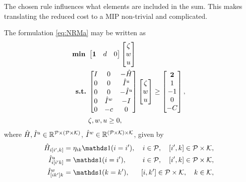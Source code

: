 The chosen rule influences what elements are included in the sum.
This makes translating the reduced cost to a MIP non-trivial and complicated.



The formulation \eqref{eq:NRMa} may be written as
\begin{equation}\label{eq:NRMa_primal_vector}
    \begin{split}
        \text{\textbf{min }} & \begin{bmatrix}
                   \bm{1} & d & 0
        \end{bmatrix} \begin{bmatrix}
                          \zeta \\ w \\ u
        \end{bmatrix} \\
        \text{\textbf{s.t.}}\; &
        \begin{bmatrix}
            I & 0 & -\hat{H} \\
            0 & 0 & \hat{I}^u \\
            0 & 0 & -\hat{I}^u \\
            0 & \hat{I}^w & -I \\
            0 & -c & 0
        \end{bmatrix}
        \begin{bmatrix}
            \zeta \\ w \\ u
        \end{bmatrix}
        \geq \begin{bmatrix}
                 \bm{2} \\ 1 \\ -1 \\ 0 \\ -C
        \end{bmatrix}, \\
        & \zeta, w, u \geq 0,
    \end{split}
\end{equation}
where $\hat{H}, \hat{I}^u \in \mathbb{R}^{\mathcal{P} \times (\mathcal{P} \times \mathcal{K})}$, $\hat{I}^w \in \mathbb{R}^{(\mathcal{P} \times \mathcal{K}) \times \mathcal{K}}$, given by
\begin{align*}
    \hat{H}_{i[i',k]} &= \eta_{ik} \Ind(i = i'), & i \in \P, \quad [i', k] \in \P \times \K, \\
    \hat{I}^u_{i[i'k]} &= \Ind(i = i'), & i \in \P, \quad [i', k] \in \P \times \K, \\
    \hat{I}^w_{[ik']k} &= \Ind(k = k'), & [i, k'] \in \P \times \K, \quad k \in \K,
\end{align*}
